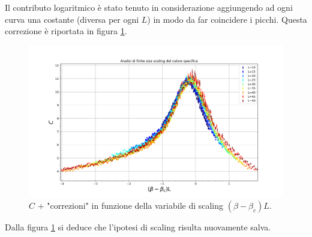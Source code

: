\documentclass[10pt,a4paper]{article}
\begin{document}
Il contributo logaritmico è stato tenuto in considerazione aggiungendo ad ogni curva una costante (diversa per ogni $L$) in modo da far coincidere i picchi. Questa correzione è riportata in figura \ref{fig:calspecFSScorr}.
\begin{figure}[h!]
	\centering
	\includegraphics[width=1\linewidth]{cal_corr}
	\caption{$C$ + "correzioni" in funzione della variabile di scaling $(\beta-\beta_c)L$.}
	\label{fig:calspecFSScorr}
\end{figure}

Dalla figura \ref{fig:calspecFSScorr} si deduce che l'ipotesi di scaling risulta nuovamente salva.
\end{document}
